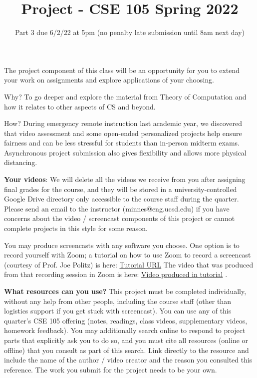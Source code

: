 

\title{Project - CSE 105 Spring 2022}
\date{Part 3 due 6/2/22 at 5pm (no penalty late submission until 8am next day)}


\maketitle
\thispagestyle{fancy}

\vspace{-30pt}

 The project component of this class will be an opportunity for you to extend your work on 
 assignments and explore applications of your choosing. 
 
 Why?  To go deeper and explore the material from Theory of Computation and how it relates to 
 other aspects of CS and beyond. 
 
 How?  During emergency remote instruction last academic year, we discovered that video 
 assessment and some open-ended personalized projects help ensure fairness and can be less 
 stressful for students than in-person midterm exams. Asynchronous project submission also 
 gives flexibility and allows more physical distancing. 
 
 {\bf Your videos}: We will delete all the videos we receive from you after assigning final grades for 
 the course, and they will be stored in a university-controlled Google Drive directory only 
 accessible to the course staff during the quarter. Please send an email to the instructor 
 (minnes@eng.ucsd.edu) if you have concerns about the video / screencast components of this 
 project or cannot complete projects in this style for some reason. 
 
 You may produce screencasts with any software you choose. One option is to record yourself 
 with Zoom; a tutorial on how to use Zoom to record a screencast (courtesy of Prof. Joe Politz) is 
 here: \href{https://drive.google.com/open?id=1KROMAQuTCk40zwrEFotlYSJJQdcG_GUU}{Tutorial URL}
 The video that was produced from that recording session in Zoom is here:
 \href{{https://drive.google.com/open?id=1MxJN6CQcXqIbOekDYMxjh7mTt1TyRVMl}}{Video produced in tutorial} .
 
 {\bf What resources can you use? }
 This project must be completed individually, without any help from other people, 
 including the course staff (other than logistics support if you get stuck with screencast). 
 You can use any of this quarter’s CSE 105 offering (notes, readings, class videos, 
 supplementary videos, homework feedback). You may additionally search online to respond to 
 project parts that explicitly ask you to do so, and you must  cite all resources (online or offline) 
 that you consult as part of this search. Link directly to the resource and include the name of the 
 author / video creator and the reason you consulted this reference. The work you submit for the 
 project needs to be your own. 
 
